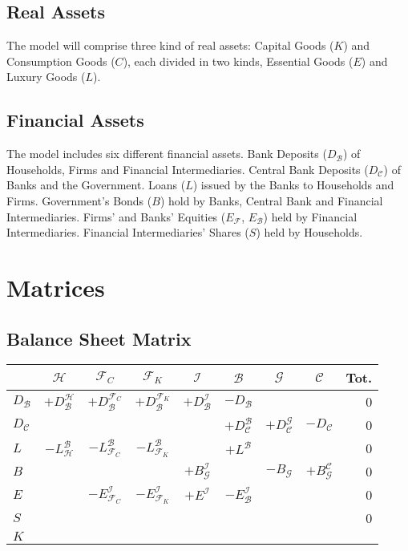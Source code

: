 \documentclass[a4paper, headings=standardclasses]{scrartcl}
\begin{document}
\subsection{Real Assets}
The model will comprise three kind of real assets: Capital Goods ($K$) and Consumption Goods ($C$), each divided in two kinds, Essential Goods ($E$) and Luxury Goods ($L$).

\subsection{Financial Assets}
The model includes six different financial assets. 
Bank Deposits ($D_\mathcal{B}$) of Households, Firms and Financial Intermediaries. 
Central Bank Deposits ($D_\mathcal{C}$) of Banks and the Government. 
Loans ($L$) issued by the Banks to Households and Firms. Government's Bonds ($B$) hold by Banks, Central Bank and Financial Intermediaries. 
Firms' and Banks' Equities ($E_\mathcal{F}$, $E_\mathcal{B}$) held by Financial Intermediaries.
Financial Intermediaries' Shares ($S$) held by Households.

\section{Matrices}
\subsection{Balance Sheet Matrix}

\begin{tabular}{l|ccccccc|r}
	\toprule
	& $\mathcal{H}$ & $\mathcal{F}_C$ & $\mathcal{F}_K$ & $\mathcal{I}$ & $\mathcal{B}$ & $\mathcal{G}$ & $\mathcal{C}$ & Tot. \\
	\midrule
	$D_\mathcal{B}$ & $+D_\mathcal{B}^\mathcal{H}$ & $+D_\mathcal{B}^{\mathcal{F}_C}$ & $+D_\mathcal{B}^{\mathcal{F}_K}$ &  $+D_\mathcal{B}^\mathcal{I}$  &  $-D_\mathcal{B}$ & & & 0 \\
	$D_\mathcal{C}$ & & & & & $+D_\mathcal{C}^\mathcal{B}$ & $+D_\mathcal{C}^\mathcal{G}$ & $-D_\mathcal{C}$ & 0 \\
	$L$ & $-L_\mathcal{H}^\mathcal{B}$ & $-L_{\mathcal{F}_C}^\mathcal{B}$ & $-L_{\mathcal{F}_K}^\mathcal{B}$ & & $+L^\mathcal{B}$ & & & 0 \\
	$B$ & & & & $+B_\mathcal{G}^\mathcal{I}$ & & $-B_\mathcal{G}$ & $+B_\mathcal{G}^\mathcal{C}$ & 0 \\
	$E$ & & $-E_{\mathcal{F}_C}^\mathcal{I}$ & $-E_{\mathcal{F}_K}^\mathcal{I}$ & $+E^\mathcal{I}$ & $-E_\mathcal{B}^\mathcal{I}$ & & & 0 \\
	$S$ & & & & & & & & 0 \\
	$K$ & & & & & & & & \\
	\bottomrule
\end{tabular}
\end{document}
